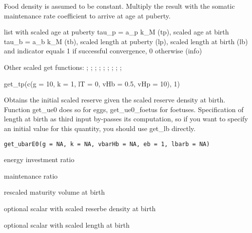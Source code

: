 \documentclass[a4paper]{book}
\begin{document}
%
\begin{Details}\relax
Food density is assumed to be constant. Multiply the result with the
somatic maintenance rate coefficient to arrive at age at puberty.
\end{Details}
%
\begin{Value}
list with scaled age at puberty tau\_p = a\_p k\_M (tp),
scaled age at birth tau\_b = a\_b k\_M (tb),
scaled length at puberty (lp), scaled length at birth (lb)
and indicator equals 1 if successful convergence, 0 otherwise (info)
\end{Value}
%
\begin{SeeAlso}\relax
Other scaled get functions: ;
; ;
; ;
; ;
;
;
\end{SeeAlso}
%
\begin{Examples}
\begin{ExampleCode}
get_tp(c(g = 10, k = 1, lT = 0, vHb = 0.5, vHp = 10), 1)
\end{ExampleCode}
\end{Examples}
%
\begin{Description}\relax
Obtains the initial scaled reserve given the scaled reserve density at birth.
Function get\_ue0 does so for eggs, get\_ue0\_foetus for foetuses.
Specification of length at birth as third input by-passes its computation,
so if you want to specify an initial value for this quantity, you should use get\_lb directly.
\end{Description}
%
\begin{Usage}
\begin{verbatim}
get_ubarE0(g = NA, k = NA, vbarHb = NA, eb = 1, lbarb = NA)
\end{verbatim}
\end{Usage}
%
\begin{Arguments}
\begin{ldescription}
\item[\code{g}] energy investment ratio

\item[\code{k}] maintenance ratio

\item[\code{vbarHb}] rescaled maturity volume at birth

\item[\code{eb}] optional scalar with scaled reserbe density at birth

\item[\code{lbarb}] optional scalar with scaled length at birth
\end{ldescription}
\end{Arguments}
\end{document}
